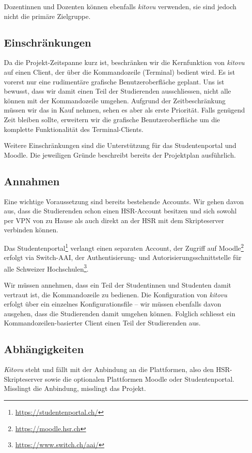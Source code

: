 \documentclass[a4paper]{article}
\begin{document}
Dozentinnen und Dozenten können ebenfalls \emph{kitovu} verwenden, sie sind jedoch nicht die primäre Zielgruppe.

\subsection{Einschränkungen}
Da die Projekt-Zeitspanne kurz ist, beschränken wir die Kernfunktion von \emph{kitovu} auf einen Client, der über die Kommandozeile (Terminal) bedient wird. Es ist vorerst nur eine rudimentäre grafische Benutzeroberfläche geplant. Uns ist bewusst, dass wir damit einen Teil der Studierenden ausschliessen, nicht alle können mit der Kommandozeile umgehen. Aufgrund der Zeitbeschränkung müssen wir das in Kauf nehmen, sehen es aber als erste Priorität. Falls genügend Zeit bleiben sollte, erweitern wir die grafische Benutzeroberfläche um die komplette Funktionalität des Terminal-Clients.

Weitere Einschränkungen sind die Unterstützung für das Studentenportal und Moodle. Die jeweiligen Gründe beschreibt bereits der Projektplan ausführlich.


\subsection{Annahmen}
Eine wichtige Voraussetzung sind bereits bestehende Accounts. Wir gehen davon aus, dass die Studierenden schon einen HSR-Account besitzen und sich sowohl per VPN von zu Hause als auch direkt an der HSR mit dem Skripteserver verbinden können.

Das Studentenportal\footnote{\url{https://studentenportal.ch/}} verlangt einen separaten Account, der Zugriff auf Moodle\footnote{\url{https://moodle.hsr.ch}} erfolgt via Switch-AAI, der Authentisierung- und Autorisierungsschnittstelle für alle Schweizer Hochschulen\footnote{\url{https://www.switch.ch/aai/}}.

Wir müssen annehmen, dass ein Teil der Studentinnen und Studenten damit vertraut ist, die Kommandozeile zu bedienen. Die Konfiguration von \emph{kitovu} erfolgt über ein einzelnes Konfigurationsfile -- wir müssen ebenfalls davon ausgehen, dass die Studierenden damit umgehen können. Folglich schliesst ein Kommandozeilen-basierter Client einen Teil der Studierenden aus.

\subsection{Abhängigkeiten}
\emph{Kitovu} steht und fällt mit der Anbindung an die Plattformen, also den HSR-Skripteserver sowie die optionalen Plattformen Moodle oder Studentenportal. Misslingt die Anbindung, misslingt das Projekt.
\end{document}
